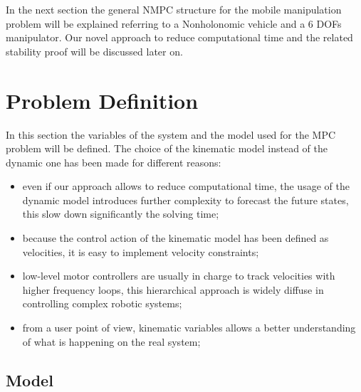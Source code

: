 In the next section the general NMPC structure for the mobile manipulation problem will be explained referring to a Nonholonomic vehicle and a 6 DOFs manipulator. Our novel approach to reduce computational time and the related stability proof will be discussed later on.

\section{Problem Definition}

In this section the variables of the system and the model used for the MPC problem will be defined. The choice of the kinematic model instead of the dynamic one has been made for different reasons:

\begin{itemize}
\item even if our approach allows to reduce computational time, the usage of the dynamic model introduces further complexity to forecast the future states, this slow down significantly the solving time;
\item because the control action of the kinematic model has been defined as velocities, it is easy to implement velocity constraints;
\item low-level motor controllers are usually in charge to track velocities with higher frequency loops, this hierarchical approach is widely diffuse in controlling complex robotic systems;
\item from a user point of view, kinematic variables allows a better understanding of what is happening on the real system;
\end{itemize}

\subsection{Model}

